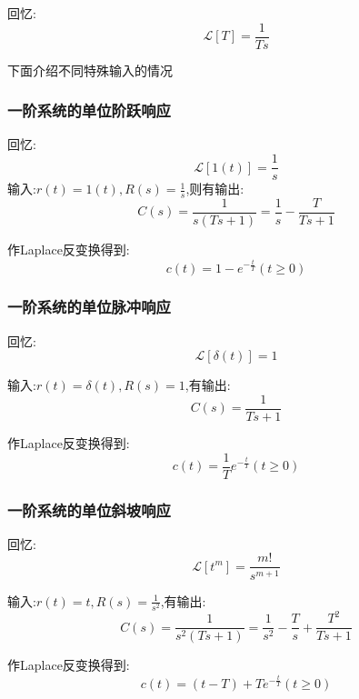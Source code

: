\documentclass[12pt,a4paper,oneside]{ctexart}
\begin{document}
回忆:
\[
    \mathcal{L}[T] = \frac{1}{Ts}
\]

下面介绍不同特殊输入的情况

\subsubsection{一阶系统的单位阶跃响应}
回忆:\[\mathcal{L}[1(t)] = \frac{1}{s}\]
输入:$r(t)=1(t),R(s)=\frac{1}{s}$,则有输出:
\[
    C(s)=\frac{1}{s(Ts+1)}=\frac{1}{s} - \frac{T}{Ts+1}
\]

作Laplace反变换得到:
\[
    c(t)=1-e^{-\frac{t}{T}}(t\geqslant 0)
\]

\subsubsection{一阶系统的单位脉冲响应}
回忆:\[\mathcal{L}[\delta(t)]=1\]

输入:$r(t)=\delta(t),R(s)=1$,有输出:
\[
    C(s)=\frac{1}{Ts+1}
\]

作Laplace反变换得到:
\[
    c(t)=\frac{1}{T}e^{-\frac{t}{T}}(t\geqslant 0)
\]

\subsubsection{一阶系统的单位斜坡响应}
回忆:\[\mathcal{L}[t^m]=\frac{m!}{s^{m+1}}\]

输入:$r(t)=t,R(s)=\frac{1}{s^2}$,有输出:
\[
    C(s)=\frac{1}{s^2(Ts+1)}=\frac{1}{s^2}-\frac{T}{s}+\frac{T^2}{Ts+1}
\]

作Laplace反变换得到:
\[
    c(t)=(t-T)+Te^{-\frac{t}{T}}(t\geqslant 0)
\]
\end{document}
